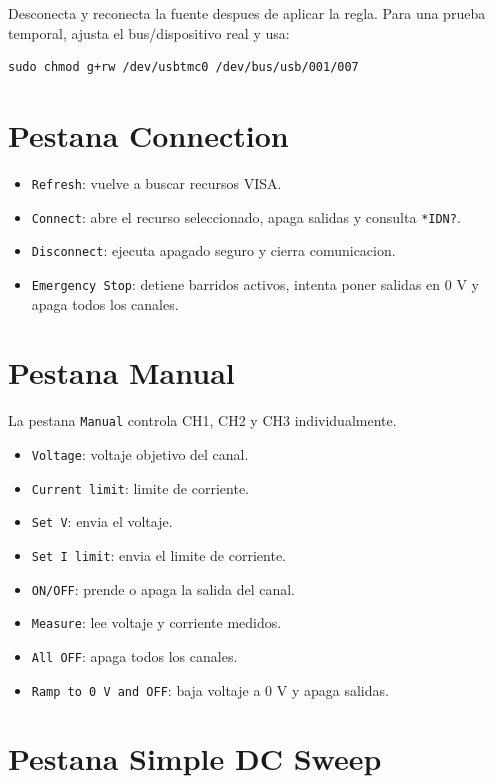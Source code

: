 \documentclass[11pt,letterpaper]{article}
\begin{document}
Desconecta y reconecta la fuente despues de aplicar la regla. Para una prueba
temporal, ajusta el bus/dispositivo real y usa:

\begin{verbatim}
sudo chmod g+rw /dev/usbtmc0 /dev/bus/usb/001/007
\end{verbatim}

\section{Pestana Connection}

\begin{itemize}
  \item \texttt{Refresh}: vuelve a buscar recursos VISA.
  \item \texttt{Connect}: abre el recurso seleccionado, apaga salidas y consulta
        \texttt{*IDN?}.
  \item \texttt{Disconnect}: ejecuta apagado seguro y cierra comunicacion.
  \item \texttt{Emergency Stop}: detiene barridos activos, intenta poner salidas
        en 0 V y apaga todos los canales.
\end{itemize}

\section{Pestana Manual}

La pestana \texttt{Manual} controla CH1, CH2 y CH3 individualmente.

\begin{itemize}
  \item \texttt{Voltage}: voltaje objetivo del canal.
  \item \texttt{Current limit}: limite de corriente.
  \item \texttt{Set V}: envia el voltaje.
  \item \texttt{Set I limit}: envia el limite de corriente.
  \item \texttt{ON/OFF}: prende o apaga la salida del canal.
  \item \texttt{Measure}: lee voltaje y corriente medidos.
  \item \texttt{All OFF}: apaga todos los canales.
  \item \texttt{Ramp to 0 V and OFF}: baja voltaje a 0 V y apaga salidas.
\end{itemize}

\section{Pestana Simple DC Sweep}
\end{document}
